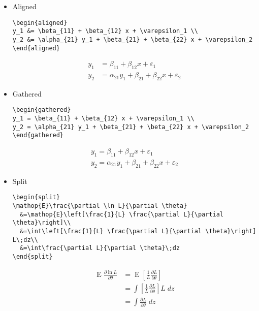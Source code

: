\documentclass[text,xhtml,itex]{internet}
\begin{document}
\begin{itemize}
\item Aligned

\begin{verbatim}
\begin{aligned}
y_1 &= \beta_{11} + \beta_{12} x + \varepsilon_1 \\
y_2 &= \alpha_{21} y_1 + \beta_{21} + \beta_{22} x + \varepsilon_2
\end{aligned}
\end{verbatim}

\[
\begin{aligned}
y_1 &= \beta_{11} + \beta_{12} x + \varepsilon_1 \\
y_2 &= \alpha_{21} y_1 + \beta_{21} + \beta_{22} x + \varepsilon_2
\end{aligned}
\]

\item Gathered

\begin{verbatim}
\begin{gathered}
y_1 = \beta_{11} + \beta_{12} x + \varepsilon_1 \\
y_2 = \alpha_{21} y_1 + \beta_{21} + \beta_{22} x + \varepsilon_2
\end{gathered}
\end{verbatim}

\[
\begin{gathered}
y_1 = \beta_{11} + \beta_{12} x + \varepsilon_1 \\
y_2 = \alpha_{21} y_1 + \beta_{21} + \beta_{22} x + \varepsilon_2
\end{gathered}
\]


\item Split

\begin{verbatim}
\begin{split}
\mathop{E}\frac{\partial \ln L}{\partial \theta}
  &=\mathop{E}\left[\frac{1}{L} \frac{\partial L}{\partial \theta}\right]\\
  &=\int\left[\frac{1}{L} \frac{\partial L}{\partial \theta}\right] L\;dz\\
  &=\int\frac{\partial L}{\partial \theta}\;dz
\end{split}
\end{verbatim}

\[
\begin{split}
\mathop{E}\frac{\partial \ln L}{\partial \theta}
  &= \mathop{E} \left[ \frac{1}{L} \frac{\partial L}{\partial \theta} \right] \\
  &= \int \left[ \frac{1}{L} \frac{\partial L}{\partial \theta} \right] L\;dz \\
  &= \int \frac{\partial L}{\partial \theta}\;dz
\end{split}
\]
\end{itemize}
\end{document}
